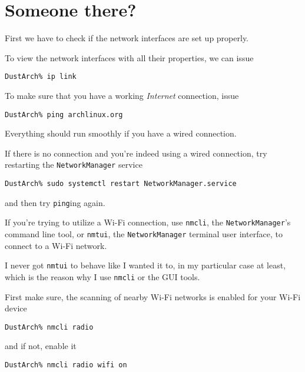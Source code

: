 \documentclass[10pt]{dustdoc}
\begin{document}
\section{Someone there?}
\label{sec:someone-there}

First we have to check if the network interfaces are set up properly.

To view the network interfaces with all their properties, we can issue

\begin{verbatim}
DustArch% ip link
\end{verbatim}

To make sure that you have a working \emph{Internet} connection, issue

\begin{verbatim}
DustArch% ping archlinux.org
\end{verbatim}

Everything should run smoothly if you have a wired connection.

If there is no connection and you’re indeed using a wired connection, try restarting the \texttt{NetworkManager} service

\begin{verbatim}
DustArch% sudo systemctl restart NetworkManager.service
\end{verbatim}

\noindent
and then try \texttt{ping}ing again.

If you're trying to utilize a Wi-Fi connection, use \texttt{nmcli}, the \texttt{Network\allowbreak{}Manager}'s command line tool, or \texttt{nmtui}, the \texttt{NetworkManager} terminal user interface, to connect to a Wi-Fi network.

\begin{NOTE}
    I never got \texttt{nmtui} to behave like I wanted it to, in my particular case at least, which is the reason why I use \texttt{nmcli} or the GUI tools.
\end{NOTE}

First make sure, the scanning of nearby Wi-Fi networks is enabled for your Wi-Fi device

\begin{verbatim}
DustArch% nmcli radio
\end{verbatim}

\noindent
and if not, enable it

\begin{verbatim}
DustArch% nmcli radio wifi on
\end{verbatim}
\end{document}
